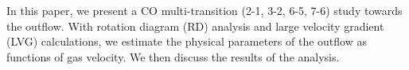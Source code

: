 In this paper, we present a CO multi-transition (2-1, 3-2, 6-5, 7-6) study towards the  outflow. With rotation diagram (RD) analysis and large velocity gradient (LVG) calculations, we estimate the physical parameters of the outflow as functions of gas velocity. We then discuss the results of the analysis.


